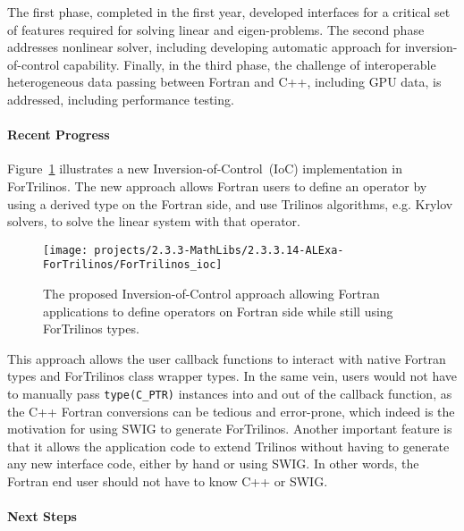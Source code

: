 The first phase, completed in the first year, developed interfaces for a critical set of features required for solving linear and eigen-problems. The second phase addresses nonlinear solver, including developing automatic approach for inversion-of-control capability. Finally, in the third phase, the challenge of interoperable heterogeneous data passing between Fortran and C++, including GPU data, is addressed, including performance testing.

\paragraph{Recent Progress}

Figure~\ref{fig:fortran_ioc} illustrates a new Inversion-of-Control~(IoC)
implementation in ForTrilinos. The new approach allows Fortran users to define
an operator by using a derived type on the Fortran side, and use Trilinos
algorithms, e.g. Krylov solvers, to solve the linear system with that operator.

\begin{figure}[htb]
    \centering
    \texttt{[image: projects/2.3.3-MathLibs/2.3.3.14-ALExa-ForTrilinos/ForTrilinos\_ioc]}
    \caption{\label{fig:fortran_ioc}The proposed Inversion-of-Control approach
    allowing Fortran applications to define operators on Fortran side while
    still using ForTrilinos types.}
\end{figure}

This approach allows the user callback functions to interact with native Fortran
types and ForTrilinos class wrapper types. In the same vein, users would not
have to manually pass \texttt{type(C\_PTR)} instances into and out of the
callback function, as the C++ Fortran conversions can be tedious and
error-prone, which indeed is the motivation for using SWIG to generate
ForTrilinos.  Another important feature is that it allows the application code
to extend Trilinos without having to generate any new interface code, either by
hand or using SWIG. In other words, the Fortran end user should not have to know
C++ or SWIG.

\paragraph{Next Steps}

